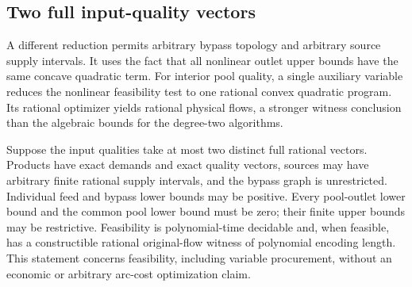 \subsection{Two full input-quality vectors}\label{s5:two-vectors}

A different reduction permits arbitrary bypass topology and arbitrary
source supply intervals. It uses the fact that all nonlinear outlet
upper bounds have the same concave quadratic term. For interior pool quality, a single
auxiliary variable reduces the nonlinear feasibility test to one rational
convex quadratic program. Its rational optimizer yields rational
physical flows, a stronger witness conclusion than the algebraic
bounds for the degree-two algorithms.

\begin{theorem}
\label{s5:two-vector-theorem}
Suppose the input qualities take at most two distinct full rational
vectors. Products have exact demands and exact quality vectors, sources
may have arbitrary finite rational supply intervals, and the bypass
graph is unrestricted. Individual feed and bypass lower bounds may be
positive. Every pool-outlet lower bound and the common pool lower bound
must be zero; their finite upper bounds may be restrictive. Feasibility
is polynomial-time decidable and, when feasible, has a constructible
rational original-flow witness of polynomial encoding length. This
statement concerns feasibility, including variable procurement, without
an economic or arbitrary arc-cost optimization claim.
\end{theorem}
